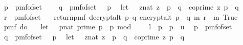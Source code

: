 \begin{isabellebody}
\ \ p\ {\isasymleftarrow}\ pmf{\isacharunderscore}{\kern0pt}of{\isacharunderscore}{\kern0pt}set\ {\isasymK}{\isacharsemicolon}{\kern0pt}\ \isanewline
\ \ q\ {\isasymleftarrow}\ pmf{\isacharunderscore}{\kern0pt}of{\isacharunderscore}{\kern0pt}set\ {\isacharparenleft}{\kern0pt}{\isasymK}\ {\isacharminus}{\kern0pt}\ {\isacharbraceleft}{\kern0pt}p{\isacharbraceright}{\kern0pt}{\isacharparenright}{\kern0pt}{\isacharsemicolon}{\kern0pt}\isanewline
\ \ let\ {\isasymZ}\ {\isacharequal}{\kern0pt}\ {\isacharbraceleft}{\kern0pt}{\isacharparenleft}{\kern0pt}z{\isacharcolon}{\kern0pt}{\isacharcolon}{\kern0pt}nat{\isacharparenright}{\kern0pt}{\isachardot}{\kern0pt}\ z\ {\isacharless}{\kern0pt}\ p\ {\isacharasterisk}{\kern0pt}\ q\ {\isasymand}\ coprime\ z\ {\isacharparenleft}{\kern0pt}p\ {\isacharasterisk}{\kern0pt}\ q{\isacharparenright}{\kern0pt}{\isacharbraceright}{\kern0pt}{\isacharsemicolon}{\kern0pt}\isanewline
\ \ r\ {\isasymleftarrow}\ pmf{\isacharunderscore}{\kern0pt}of{\isacharunderscore}{\kern0pt}set\ {\isasymZ}{\isacharsemicolon}{\kern0pt}\isanewline
\ \ return{\isacharunderscore}{\kern0pt}pmf\ {\isacharparenleft}{\kern0pt}decrypt{\isacharunderscore}{\kern0pt}alt\ p\ q\ {\isacharparenleft}{\kern0pt}encrypt{\isacharunderscore}{\kern0pt}alt\ {\isacharparenleft}{\kern0pt}p\ {\isacharasterisk}{\kern0pt}\ q{\isacharparenright}{\kern0pt}\ m\ r{\isacharparenright}{\kern0pt}\ {\isacharequal}{\kern0pt}\ m{\isacharparenright}{\kern0pt}{\isacharbraceright}{\kern0pt}{\isacharparenright}{\kern0pt}\ True\isanewline
\ \ {\isacharequal}{\kern0pt}\ \isanewline
\ \ pmf\ {\isacharparenleft}{\kern0pt}do\ {\isacharbraceleft}{\kern0pt}\isanewline
\ \ let\ {\isasymK}\ {\isacharequal}{\kern0pt}\ {\isacharbraceleft}{\kern0pt}{\isacharparenleft}{\kern0pt}p{\isacharcolon}{\kern0pt}{\isacharcolon}{\kern0pt}nat{\isacharparenright}{\kern0pt}{\isachardot}{\kern0pt}\ prime\ p\ {\isasymand}\ p\ mod\ {}\ {\isacharequal}{\kern0pt}\ {}\ {\isasymand}\ l\ {\isasymle}\ p\ {\isasymand}\ p\ {\isasymle}\ u{\isacharbraceright}{\kern0pt}{\isacharsemicolon}{\kern0pt}\isanewline
\ \ p\ {\isasymleftarrow}\ pmf{\isacharunderscore}{\kern0pt}of{\isacharunderscore}{\kern0pt}set\ {\isasymK}{\isacharsemicolon}{\kern0pt}\ \isanewline
\ \ q\ {\isasymleftarrow}\ pmf{\isacharunderscore}{\kern0pt}of{\isacharunderscore}{\kern0pt}set\ {\isacharparenleft}{\kern0pt}{\isasymK}\ {\isacharminus}{\kern0pt}\ {\isacharbraceleft}{\kern0pt}p{\isacharbraceright}{\kern0pt}{\isacharparenright}{\kern0pt}{\isacharsemicolon}{\kern0pt}\isanewline
\ \ let\ {\isasymZ}\ {\isacharequal}{\kern0pt}\ {\isacharbraceleft}{\kern0pt}{\isacharparenleft}{\kern0pt}z{\isacharcolon}{\kern0pt}{\isacharcolon}{\kern0pt}nat{\isacharparenright}{\kern0pt}{\isachardot}{\kern0pt}\ z\ {\isacharless}{\kern0pt}\ p\ {\isacharasterisk}{\kern0pt}\ q\ {\isasymand}\ coprime\ z\ {\isacharparenleft}{\kern0pt}p\ {\isacharasterisk}{\kern0pt}\ q{\isacharparenright}{\kern0pt}{\isacharbraceright}{\kern0pt}{\isacharsemicolon}{\kern0pt}\isanewline

\end{isabellebody}
